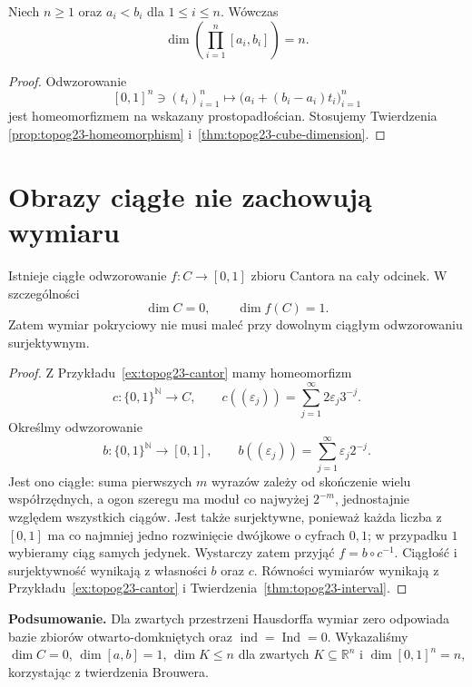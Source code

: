 \begin{wniosek}
\label{cor:topog23-box-dimension}
Niech \(n\ge1\) oraz \(a_i<b_i\)
dla \(1\le i\le n\).
Wówczas
\[
 \dim\left(\prod_{i=1}^n[a_i,b_i]\right)=n.
\]
\end{wniosek}
\begin{proof}
Odwzorowanie
\[
 [0,1]^n\ni(t_i)_{i=1}^n
 \longmapsto
 \bigl(a_i+(b_i-a_i)t_i\bigr)_{i=1}^n
\]
jest homeomorfizmem na wskazany prostopadłościan.
Stosujemy Twierdzenia
\ref{prop:topog23-homeomorphism}
i~\ref{thm:topog23-cube-dimension}.
\end{proof}

\section{Obrazy ciągłe nie zachowują wymiaru}
\label{sec:topog23-images}

\begin{twierdzenie}
\label{thm:topog23-cantor-surjection}
Istnieje ciągłe odwzorowanie
\(f\colon C\to[0,1]\) zbioru Cantora
na cały odcinek.
W szczególności
\[
 \dim C=0,\qquad \dim f(C)=1.
\]
Zatem wymiar pokryciowy nie musi
maleć przy dowolnym ciągłym
odwzorowaniu surjektywnym.
\end{twierdzenie}
\begin{proof}
Z Przykładu~\ref{ex:topog23-cantor}
mamy homeomorfizm
\[
 c\colon\{0,1\}^{\mathbb N}\to C,\qquad
 c((\varepsilon_j))=\sum_{j=1}^{\infty}
                       2\varepsilon_j3^{-j}.
\]
Określmy odwzorowanie
\[
 b\colon\{0,1\}^{\mathbb N}\to[0,1],
 \qquad b((\varepsilon_j))=
             \sum_{j=1}^{\infty}\varepsilon_j2^{-j}.
\]
Jest ono ciągłe: suma pierwszych \(m\)
wyrazów zależy od skończenie wielu
współrzędnych, a ogon szeregu
ma moduł co najwyżej \(2^{-m}\),
jednostajnie względem wszystkich ciągów.
Jest także surjektywne,
ponieważ każda liczba z \([0,1]\)
ma co najmniej jedno rozwinięcie dwójkowe
o cyfrach \(0,1\); w przypadku \(1\)
wybieramy ciąg samych jedynek.
Wystarczy zatem przyjąć
\(f=b\circ c^{-1}\).
Ciągłość i surjektywność wynikają
z własności \(b\) oraz \(c\).
Równości wymiarów wynikają
z Przykładu~\ref{ex:topog23-cantor}
i Twierdzenia~\ref{thm:topog23-interval}.
\end{proof}

\par\smallskip\noindent{}\label{sec:topog23-summary}\textbf{Podsumowanie.}
Dla zwartych przestrzeni Hausdorffa wymiar zero odpowiada
bazie zbiorów otwarto-domkniętych oraz
\(\operatorname{ind}=\operatorname{Ind}=0\).
Wykazaliśmy \(\dim C=0\), \(\dim[a,b]=1\),
\(\dim K\le n\) dla zwartych \(K\subseteq\mathbb R^n\)
i \(\dim[0,1]^n=n\), korzystając z twierdzenia Brouwera.